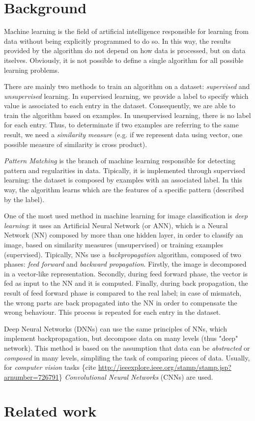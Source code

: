 \section{Background}

Machine learning is the field of artificial intelligence responsible for learning from data without being explicitly programmed to do so. In this way, the results provided by the algorithm do not depend on how data is processed, but on data itselves. Obviously, it is not possible to define a single algorithm for all possible learning problems.

There are mainly two methods to train an algorithm on a dataset: \textit{supervised} and \textit{unsupervised} learning. In supervised learning, we provide a label to specify which value is associated to each entry in the dataset. Consequently, we are able to train the algorithm based on examples. In unsupervised learning, there is no label for each entry. Thus, to determinate if two examples are referring to the same result, we need a \textit{similarity measure} (e.g. if we represent data using vector, one possible measure of similarity is cross product).

\textit{Pattern Matching} is the branch of machine learning responsible for detecting pattern and regularities in data. Tipically, it is implemented through supervised learning: the dataset is composed by examples with an associated label. In this way, the algorithm learns which are the features of a specific pattern (described by the label).

One of the most used method in machine learning for image classification is \textit{deep learning}: it uses an Artificial Neural Network (or ANN), which is a Neural Network (NN) composed by more than one hidden layer, in order to classify an image, based on similarity measures (unsupervised) or training examples (supervised). Tipically, NNs use a \textit{backpropagation} algorithm, composed of two phases: \textit{feed forward} and \textit{backward propagation}. Firstly, the image is decomposed in a vector-like representation. Secondly, during feed forward phase, the vector is fed as input to the NN and it is computed. Finally, during back propagation, the result of feed forward phase is compared to the real label; in case of mismatch, the wrong parts are back propagated into the NN in order to compensate the wrong behaviour. This process is repeated for each entry in the dataset.

Deep Neural Networks (DNNs) can use the same principles of NNs, which implement backpropagation, but decompose data on many levels (thus "deep" network). This method is based on the assumption that data can be \textit{abstracted} or \textit{composed} in many levels, simplifing the task of comparing pieces of data.
Usually, for \textit{computer vision} tasks \{cite \url{http://ieeexplore.ieee.org/stamp/stamp.jsp?arnumber=726791}\} \textit{Convolutional Neural Networks} (CNNs) are used.




\section{Related work}


